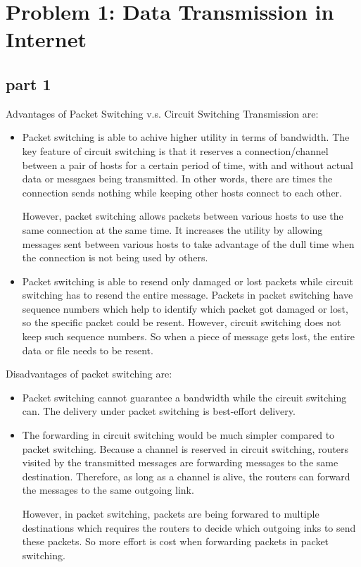 \section{Problem 1: Data Transmission in Internet}

\subsection{part 1}
Advantages of Packet Switching v.s. Circuit Switching Transmission are:

\begin{itemize}
\item Packet switching is able to achive higher utility in terms of bandwidth. The key feature of circuit switching is that it reserves a connection/channel between a pair of hosts for a certain period of time, with and without actual data or messgaes being transmitted. In other words, there are times the connection sends nothing while keeping other hosts connect to each other.

However, packet switching allows packets between various hosts to use the same connection at the same time. It increases the utility by allowing messages sent between various hosts to take advantage of the dull time when the connection is not being used by others.

\item Packet switching is able to resend only damaged or lost packets while circuit switching has to resend the entire message. Packets in packet switching have sequence numbers which help to identify which packet got damaged or lost, so the specific packet could be resent. However, circuit switching does not keep such sequence numbers. So when a piece of message gets lost, the entire data or file needs to be resent.
\end{itemize}

Disadvantages of packet switching are:

\begin{itemize}
\item Packet switching cannot guarantee a bandwidth while the circuit switching can. The delivery under packet switching is best-effort delivery.

\item The forwarding in circuit switching would be much simpler compared to packet switching. Because a channel is reserved in circuit switching, routers visited by the transmitted messages are forwarding messages to the same destination. Therefore, as long as a channel is alive, the routers can forward the messages to the same outgoing link.

However, in packet switching, packets are being forwared to multiple destinations which requires the routers to decide which outgoing inks to send these packets. So more effort is cost when forwarding packets in packet switching.
\end{itemize}

